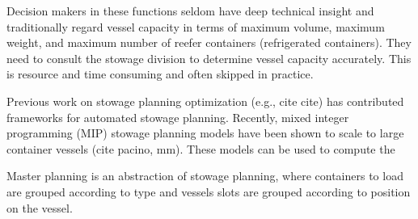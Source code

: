 Decision makers in these functions seldom have deep technical insight and traditionally regard vessel capacity in terms of maximum volume, maximum weight, and maximum number of reefer containers (refrigerated containers). They need to consult the stowage division to determine vessel capacity accurately. This is resource and time consuming and often skipped in practice.      

Previous work on stowage planning optimization (e.g., cite cite) has contributed frameworks for automated stowage planning. Recently, mixed integer programming (MIP) stowage planning models have been shown to scale to large container vessels (cite pacino, mm). These models can be used to compute the


 Master planning is an abstraction of stowage planning, where    
containers to load are grouped according to type and vessels slots are grouped according to position on the vessel. 


%


%
